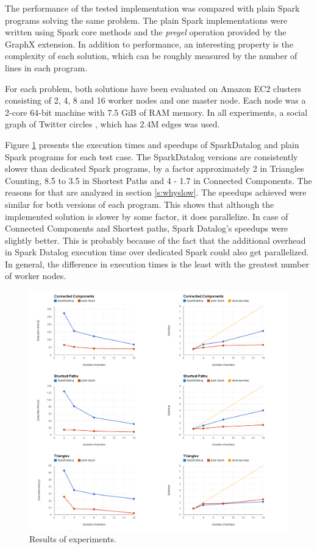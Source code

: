 The performance of the tested implementation was compared with plain Spark programs solving the same problem. The plain Spark implementations were written using Spark core methods and the \emph{pregel} operation provided by the GraphX extension. In addition to performance, an interesting property is the complexity of each solution, which can be roughly measured by the number of lines in each program.

For each problem, both solutions have been evaluated on Amazon EC2 clusters consisting of 2, 4, 8 and 16 worker nodes and one master node. Each node was a 2-core 64-bit machine with 7.5 GiB of RAM memory.  In all experiments, a social graph of Twitter circles \cite{twitterdata}, which has 2.4M edges was used.

Figure \ref{img_plots_exp} presents the execution times and speedups of SparkDatalog and plain Spark programs for each test case. The SparkDatalog versions are consistently slower than dedicated Spark programs, by a factor approximately 2 in Triangles Counting, 8.5 to 3.5 in Shortest Paths and 4 - 1.7 in Connected Components. The reasons for that are analyzed in section \ref{s:whyslow}. The speedups achieved were similar for both versions of each program. This shows that although the implemented solution is slower by some factor, it does parallelize. In case of Connected Components and Shortest paths, Spark Datalog's speedups were slightly better. This is probably because of the fact that the additional overhead in Spark Datalog execution time over dedicated Spark could also get parallelized. In general, the difference in execution times is the least with the greatest number of worker nodes.

\begin{figure}[h!]
  \centering
    \includegraphics[width=\textwidth]{images/plots_all.png}
   \caption{Results of experiments. \label{img_plots_exp}}
\end{figure}


